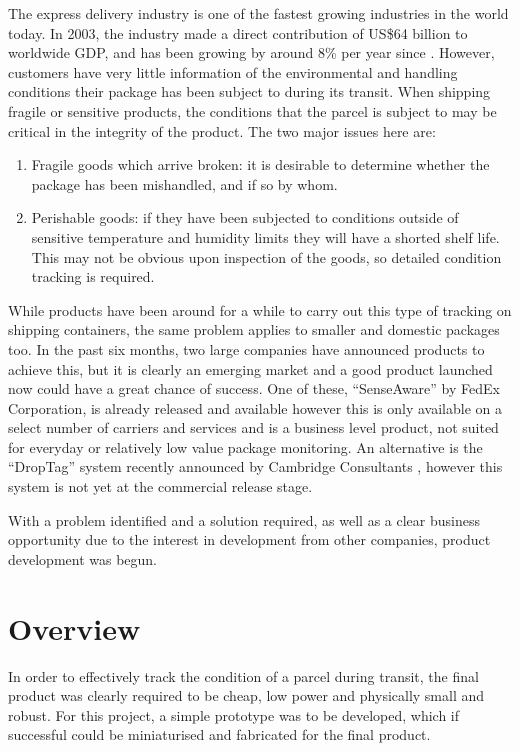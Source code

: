 \documentclass[a4paper,10pt]{article}  %
\begin{document}
The express delivery industry is one of the fastest growing industries
in the world today. In 2003, the industry made a direct contribution
of US\$64 billion to worldwide GDP, and has been growing by around 8\%
per year since \cite{OEF2005}. However, customers have very little
information of the environmental and handling conditions their package
has been subject to during its transit. When shipping fragile or
sensitive products, the conditions that the parcel is subject to may
be critical in the integrity of the product. The two major issues here
are:
\begin{enumerate}
\item Fragile goods which arrive broken: it is desirable to determine
  whether the package has been mishandled, and if so by whom.
\item Perishable goods: if they have been subjected to conditions
  outside of sensitive temperature and humidity limits they will have
  a shorted shelf life. This may not be obvious upon inspection of the
  goods, so detailed condition tracking is required.
\end{enumerate}
While products have been around for a while to carry out this type of
tracking on shipping containers, the same problem applies to smaller
and domestic packages too. In the past six months, two large companies
have announced products to achieve this, but it is clearly an emerging
market and a good product launched now could have a great chance of
success. One of these, ``SenseAware''\cite{SA_PR} by FedEx
Corporation, is already released and available however this is only
available on a select number of carriers and services and is a
business level product, not suited for everyday or relatively low
value package monitoring. An alternative is the ``DropTag'' system
recently announced by Cambridge Consultants \cite{DT_PR}, however this
system is not yet at the commercial release stage.

With a problem identified and a solution required, as well as a clear
business opportunity due to the interest in development from other
companies, product development was begun.

\section{Overview}
\label{sec:overview}

In order to effectively track the condition of a parcel during
transit, the final product was clearly required to be cheap, low power
and physically small and robust. For this project, a simple prototype
was to be developed, which if successful could be miniaturised and
fabricated for the final product.
\end{document}
